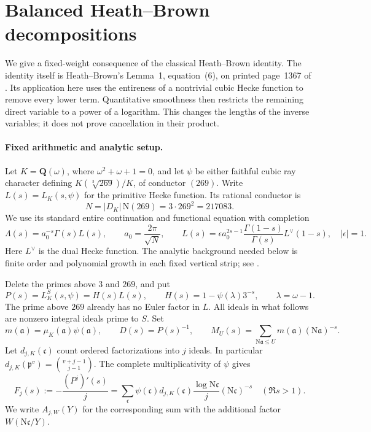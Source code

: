 \section{Balanced Heath--Brown decompositions}
\label{bfk:section}

We give a fixed-weight consequence of the classical Heath--Brown
identity.  The identity itself is Heath--Brown's Lemma~1,
equation~(6), on printed page~1367 of \cite{BFKHeathBrown}.
Its application here uses the entireness of a nontrivial cubic Hecke
function to remove every lower term.  Quantitative smoothness then
restricts the remaining direct variable to a power of a logarithm.
This changes the lengths of the inverse variables; it does not prove
cancellation in their product.

\paragraph{Fixed arithmetic and analytic setup.}

Let \(K=\mathbf Q(\omega)\), where \(\omega^2+\omega+1=0\), and let
\(\psi\) be either faithful cubic ray character defining
\(K(\sqrt[3]{269})/K\), of conductor \((269)\).
Write \(L(s)=L_K(s,\psi)\) for the primitive Hecke function.
Its rational conductor is
\[
 N=|D_K|\,\mathrm N(269)=3\cdot269^2=217083.
\]
We use its standard entire continuation and functional equation
with completion
\begin{equation}
 \Lambda(s)=a_0^{-s}\Gamma(s)L(s),\qquad
 a_0=\frac{2\pi}{\sqrt N},\qquad
 L(s)=\epsilon a_0^{2s-1}
       \frac{\Gamma(1-s)}{\Gamma(s)}L^\vee(1-s),
 \quad |\epsilon|=1.
 \label{bfk:fe}
\end{equation}
Here \(L^\vee\) is the dual Hecke function.  The analytic background
needed below is finite order and polynomial growth in each fixed
vertical strip; see \cite[\S2.1]{BFKZaman}.

Delete the primes above \(3\) and \(269\), and put
\[
 P(s)=L_K^S(s,\psi)=H(s)L(s),\qquad
 H(s)=1-\psi(\lambda)3^{-s},\qquad \lambda=\omega-1.
\]
The prime above \(269\) already has no Euler factor in \(L\).
All ideals in what follows are nonzero integral ideals prime to \(S\).
Set
\[
 m(\mathfrak a)=\mu_K(\mathfrak a)\psi(\mathfrak a),\qquad
 D(s)=P(s)^{-1},\qquad
 M_U(s)=\sum_{\mathrm N\mathfrak a\le U}
          m(\mathfrak a)(\mathrm N\mathfrak a)^{-s}.
\]
Let \(d_{j,K}(\mathfrak c)\) count ordered factorizations into \(j\)
ideals.  In particular
\(d_{j,K}(\mathfrak p^v)=\binom{v+j-1}{j-1}\).
The complete multiplicativity of \(\psi\) gives
\begin{equation}
 F_j(s):=-\frac{(P^j)'(s)}{j}
   =\sum_{\mathfrak c}
     \psi(\mathfrak c)d_{j,K}(\mathfrak c)
       \frac{\log\mathrm N\mathfrak c}{j}
       (\mathrm N\mathfrak c)^{-s}
 \quad(\Re s>1).
 \label{bfk:direct}
\end{equation}
We write \(A_{j,W}(Y)\) for the corresponding sum with
the additional factor \(W(\mathrm N\mathfrak c/Y)\).

